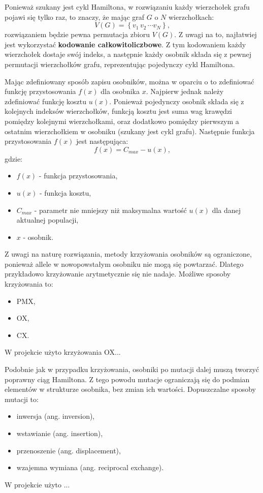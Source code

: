 \documentclass{article}
\begin{document}
Ponieważ szukany jest cykl Hamiltona, w rozwiązaniu
każdy wierzchołek grafu pojawi się tylko raz, to znaczy, że mając graf $G$ o $N$
wierzchołkach:
\begin{equation}
    V\left(G\right) = \left\{ v_1 \, v_2 \, \cdots v_N \right\},
\end{equation}
rozwiązaniem będzie pewna permutacja zbioru $V\left(G\right)$. Z uwagi na to,
najłatwiej jest wykorzystać \textbf{kodowanie całkowitoliczbowe}. Z tym
kodowaniem każdy wierzchołek dostaje swój indeks, a następnie każdy osobnik
składa się z pewnej permutacji wierzchołków grafu, reprezentując pojedynczy cykl
Hamiltona.

Mając zdefiniowany sposób zapisu osobników, można w oparciu o to zdefiniować
funkcję przystosowania $f \left( x \right)$ dla osobnika $x$. Najpierw jednak
należy zdefiniować funkcję kosztu $u \left( x \right)$. Ponieważ pojedynczy
osobnik składa się z kolejnych indeksów wierzchołków, funkcją kosztu jest
suma wag krawędzi pomiędzy kolejnymi wierzchołkami, oraz dodatkowo pomiędzy
pierwszym a ostatnim wierzchołkiem w osobniku (szukany jest cykl grafu).
Następnie funkcja przystosowania $f \left( x \right)$ jest następująca:
\begin{equation}
    f \left( x \right) = C_{max} - u \left( x \right),
\end{equation}
gdzie:
\begin{itemize}
    \item[] $f \left( x \right)$ - funkcja przystosowania,
    \item[] $u \left( x \right)$ - funkcja kosztu,
    \item[] $C_{max}$ - parametr nie mniejszy niż maksymalna wartość
            $u \left( x \right)$ dla danej aktualnej populacji,
    \item[] $x$ - osobnik.
\end{itemize}

Z uwagi na naturę rozwiązania, metody krzyżowania osobników są ograniczone,
ponieważ allele w nowopowstałym osobniku nie mogą się powtarzać. Dlatego
przykładowo krzyżowanie arytmetycznie się nie nadaje. Możliwe sposoby
krzyżowania to:
\begin{itemize}
    \item PMX,
    \item OX,
    \item CX.
\end{itemize}
W projekcie użyto krzyżowania OX...

Podobnie jak w przypadku krzyżowania, osobniki po mutacji dalej muszą tworzyć
poprawny ciąg Hamiltona. Z tego powodu mutacje ograniczają się do podmian
elementów w strukturze osobnika, bez zmian ich wartości. Dopuszczalne sposoby
mutacji to:
\begin{itemize}
    \item inwersja (ang. inversion),
    \item wstawianie (ang. insertion),
    \item przenoszenie (ang. displacement),
    \item wzajemna wymiana (ang. reciprocal exchange).
\end{itemize}
W projekcie użyto ...
\end{document}
